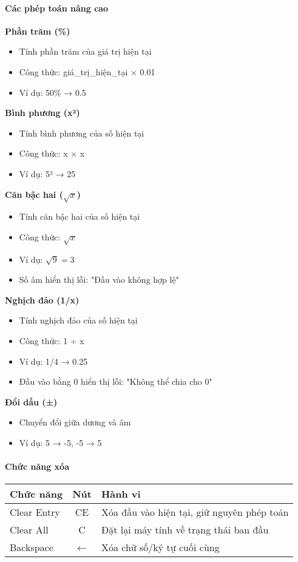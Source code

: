 \paragraph{Các phép toán nâng cao}

\textbf{Phần trăm (\%)}
\begin{itemize}
    \item Tính phần trăm của giá trị hiện tại
    \item Công thức: giá\_trị\_hiện\_tại × 0.01
    \item Ví dụ: 50\% → 0.5
\end{itemize}

\textbf{Bình phương (x²)}
\begin{itemize}
    \item Tính bình phương của số hiện tại
    \item Công thức: x × x
    \item Ví dụ: 5² → 25
\end{itemize}

\textbf{Căn bậc hai ($\sqrt{x}$)}
\begin{itemize}
    \item Tính căn bậc hai của số hiện tại
    \item Công thức: $\sqrt{x}$
    \item Ví dụ: $\sqrt{9} = 3$
    \item Số âm hiển thị lỗi: "Đầu vào không hợp lệ"
\end{itemize}

\textbf{Nghịch đảo (1/x)}
\begin{itemize}
    \item Tính nghịch đảo của số hiện tại
    \item Công thức: 1 ÷ x
    \item Ví dụ: 1/4 → 0.25
    \item Đầu vào bằng 0 hiển thị lỗi: "Không thể chia cho 0"
\end{itemize}

\textbf{Đổi dấu (±)}
\begin{itemize}
    \item Chuyển đổi giữa dương và âm
    \item Ví dụ: 5 → -5, -5 → 5
\end{itemize}

\paragraph{Chức năng xóa}

\begin{center}
\begin{tabular}{|l|c|p{8cm}|}
\hline
\textbf{Chức năng} & \textbf{Nút} & \textbf{Hành vi} \\
\hline
Clear Entry & CE & Xóa đầu vào hiện tại, giữ nguyên phép toán \\
\hline
Clear All & C & Đặt lại máy tính về trạng thái ban đầu \\
\hline
Backspace & ← & Xóa chữ số/ký tự cuối cùng \\
\hline
\end{tabular}
\end{center}


